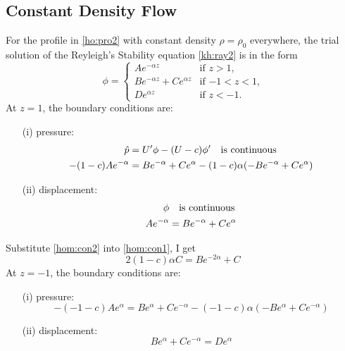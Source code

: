 \subsection{Constant Density Flow}
For the profile in \eqref{ho:pro2} with constant density
$\rho=\rho_0$ everywhere, the trial solution of the Reyleigh's
Stability equation \eqref{kh:ray2} is in the form
\begin{equation}\label{hom:con0}
\phi =
\begin{cases}
Ae^{-\alpha z} &\text{if $z>1$,}\\
Be^{-\alpha z} + Ce^{\alpha z} &\text{if $-1<z<1$,}\\
De^{\alpha z} &\text{if $z<-1$.}
\end{cases}
\end{equation}
\newslide
At $z=1$, the boundary conditions are:
\begin{enumerate}
  \item[(i)] pressure:
  \begin{align}
    \hat{p}&=U'\phi-(U-c)\phi'\quad \text{is continuous}\notag\\
    -(1-c)Ae^{-\alpha}&=Be^{-\alpha} + Ce^{\alpha}-(1-c)\alpha(-B
    e^{-\alpha}+Ce^{\alpha})\label{hom:con1}
  \end{align}
  \item[(ii)] displacement:
  \begin{align}
    \phi &\quad \text{is continuous}\notag\\
    Ae^{-\alpha}&=Be^{-\alpha} + Ce^{\alpha}\label{hom:con2}
  \end{align}
\end{enumerate}
Substitute \eqref{hom:con2} into \eqref{hom:con1}, I get
\begin{equation}\label{hom:con3}
    2(1-c)\alpha C=Be^{-2\alpha}+C
\end{equation}
\newslide
At $z=-1$, the boundary conditions are:
\begin{enumerate}
  \item[(i)] pressure:
  \begin{equation}
    -(-1-c)Ae^{\alpha}=Be^{\alpha} + Ce^{-\alpha}-(-1-c)\alpha(-B
    e^{\alpha}+Ce^{-\alpha})\label{hom:con4}
  \end{equation}
  \item[(ii)] displacement:
  \begin{equation}
    Be^{\alpha} + Ce^{-\alpha}=De^{\alpha}\label{hom:con5}
  \end{equation}
\end{enumerate}
